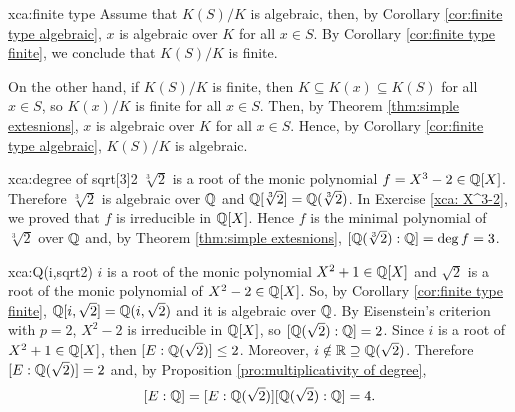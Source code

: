 \begin{sol}{xca:finite type}
    Assume that $K(S)/K$ is algebraic, then, by Corollary \ref{cor:finite type algebraic}, 
    $x$ is algebraic over $K$ for all $x\in S$.
    By Corollary \ref{cor:finite type finite}, we conclude that $K(S)/K$ is finite.

    On the other hand, if $K(S)/K$ is finite, then
    $K\subseteq K(x)\subseteq K(S)$ for all $x\in S$, so
    $K(x)/K$ is finite for all $x\in S$.
    Then, by Theorem \ref{thm:simple extesnions},
    $x$ is algebraic over $K$ for all $x\in S$.
    Hence, by Corollary \ref{cor:finite type algebraic}, $K(S)/K$ is algebraic.
 \end{sol}

\begin{sol}{xca:degree of sqrt[3]2}
    $\sqrt[3]{2}$ is a root of the monic polynomial $f=X^3-2\in \mathbb{Q}[X]$.
    Therefore $\sqrt[3]{2}$ is algebraic over $\mathbb{Q}$ 
    and $\mathbb{Q}[\sqrt[3]{2}]=\mathbb{Q}(\sqrt[3]{2})$.
    In Exercise \ref{xca: X^3-2}, we proved that
    $f$ is irreducible in $\mathbb{Q}[X]$.
    Hence $f$ is the minimal polynomial of $\sqrt[3]{2}$
    over $\mathbb{Q}$ and, by Theorem \ref{thm:simple extesnions},
    $[\mathbb{Q}(\sqrt[3]{2}):\mathbb{Q}]=\deg f=3$.
\end{sol}

\begin{sol}{xca:Q(i,sqrt2)}
    $i$ is a root of the monic polynomial $X^2+1\in\mathbb{Q}[X]$
    and $\sqrt{2}$ is a root of the monic polynomial of 
    $X^2-2\in\mathbb{Q}[X]$.
    So, by Corollary \ref{cor:finite type finite},
     $\mathbb{Q}[i,\sqrt{2}]=\mathbb{Q}(i,\sqrt{2})$ and it is algebraic over $\mathbb{Q}$.
    By Eisenstein's criterion with $p=2$,
    $X^2-2$ is irreducible in $\mathbb{Q}[X]$, so 
    $[\mathbb{Q}(\sqrt{2}):\mathbb{Q}]=2$.
    Since $i$ is a root of $X^2+1\in\mathbb{Q}[X]$,
    then $[E:\mathbb{Q}(\sqrt{2})]\leq 2$.
    Moreover, $i\notin \mathbb{R}\supseteq \mathbb{Q}(\sqrt{2})$.
    Therefore $[E:\mathbb{Q}(\sqrt{2})]=2$ and,
    by Proposition \ref{pro:multiplicativity of degree},
    $$[E:\mathbb{Q}]=[E:\mathbb{Q}(\sqrt{2})][\mathbb{Q}(\sqrt{2}):\mathbb{Q}]=4.$$
\end{sol}


